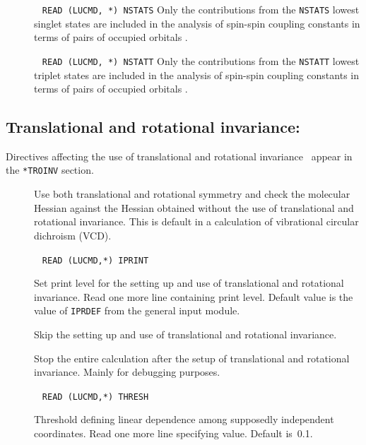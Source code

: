 \begin{description}
\item []\verb| |\newline
 \verb|READ (LUCMD, *) NSTATS|\newline
Only the contributions from the \verb|NSTATS| lowest singlet states are
included in the analysis of spin-spin coupling constants in terms of
pairs of occupied orbitals \cite{spas079,spas086}.

\item []\verb| |\newline
 \verb|READ (LUCMD, *) NSTATT|\newline
 Only the contributions from the \verb|NSTATT| lowest triplet states are
 included in the analysis of spin-spin coupling constants in terms of
pairs of occupied orbitals \cite{spas079,spas086}.
\end{description}

\subsection{Translational and rotational invariance:
}\label{sec:abatro}

Directives affecting the use of translational and rotational
invariance~\cite{trarot}
appear in the \verb|*TROINV| section.
\begin{description}
\item[] Use both translational and
 rotational symmetry
 and check the molecular Hessian against the Hessian obtained
without the use of translational and rotational invariance. This is
default in a calculation of vibrational circular dichroism
(VCD).

\item[]\verb| |\newline
\verb|READ (LUCMD,*) IPRINT|

Set print level for the setting up and use of translational and
rotational invariance.  Read one more line containing print
level. Default value is the value of \verb|IPRDEF| from the
general input module.

\item[] Skip the setting up and use of translational
and rotational invariance.

\item[] Stop the entire calculation after the setup of
translational and rotational invariance. Mainly for debugging purposes.

\item[]\verb| |\newline
\verb|READ (LUCMD,*) THRESH|

Threshold defining linear dependence among
supposedly independent coordinates.  Read one more line specifying
value.  Default is~0.1.
\end{description}

